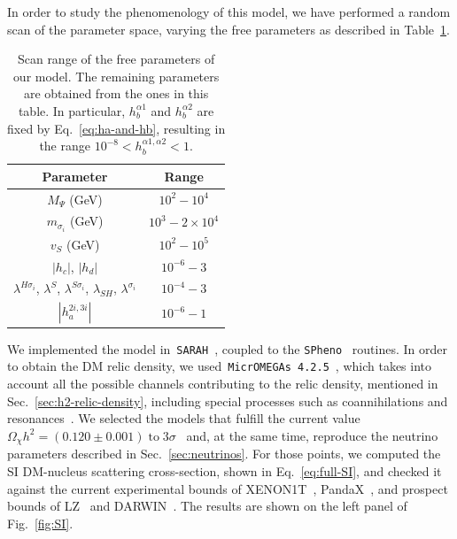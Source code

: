 \documentclass[12pt,letterpaper]{article}
\begin{document}
In order to study the phenomenology of this model, we have performed a random scan of the parameter space, varying the free parameters as described in Table~\ref{tab:scan}.
\begin{table}[t]
\centering
\begin{tabular}{|c|c|} 
\hline
Parameter & Range\\
\hline
$M_\Psi$ (GeV) & $10^{2}-10^{4}$ \\
$m_{\sigma_i}$ (GeV) & $10^{3}-2\times 10^{4}$ \\
$v_S$ (GeV) & $10^{2}-10^{5}$ \\
$|h_c|$, $|h_d|$ & $10^{-6}-3$ \\
$\lambda^{H\sigma_i}$, $\lambda^S$, $\lambda^{S\sigma_i}$, $\lambda_{SH}$, $\lambda^{\sigma_i}$ & $10^{-4}-3$ \\
$|h_a^{2i,3i}|$ & $10^{-6}-1$\\
\hline
\end{tabular}
\label{tab:scan}
\caption{Scan range of the free parameters of our model. The remaining parameters are obtained from the ones in this table. In particular, $h_b^{\alpha 1}$ and $h_b^{\alpha 2}$ are fixed by Eq.~\eqref{eq:ha-and-hb}, resulting in the range $10^{-8}< h_b^{\alpha 1,\alpha 2}<1$.}
\end{table}
We implemented the model in~\texttt{SARAH}~\cite{Staub:2008uz,Staub:2009bi,Staub:2010jh,Staub:2012pb,Staub:2013tta}, coupled to the \texttt{SPheno}~\cite{Porod:2003um,Porod:2011nf} routines. In order to obtain the DM relic density, we used~\texttt{MicrOMEGAs 4.2.5}~\cite{Belanger:2006is}, which takes into account all the possible channels contributing to the relic density, mentioned in Sec.~\ref{sec:h2-relic-density}, including special processes such as coannihilations and resonances~\cite{Griest:1990kh}. We selected the models that fulfill the current value $\Omega_\chi h^2 = (0.120 \pm 0.001)\; \text{to}\; 3\sigma$~\cite{Aghanim:2018eyx} and, at the same time, reproduce the neutrino parameters described in Sec.~\ref{sec:neutrinos}.
For those points, we computed the SI DM-nucleus scattering cross-section, shown in Eq.~\eqref{eq:full-SI}, and checked it against the current experimental bounds of XENON1T~\cite{Aprile:2018dbl}, PandaX~\cite{Cui:2017nnn}, and prospect bounds of LZ~\cite{Akerib:2018lyp} and DARWIN~\cite{Aalbers:2016jon}. The results are shown on the left panel of Fig.~\ref{fig:SI}.  
\end{document}
